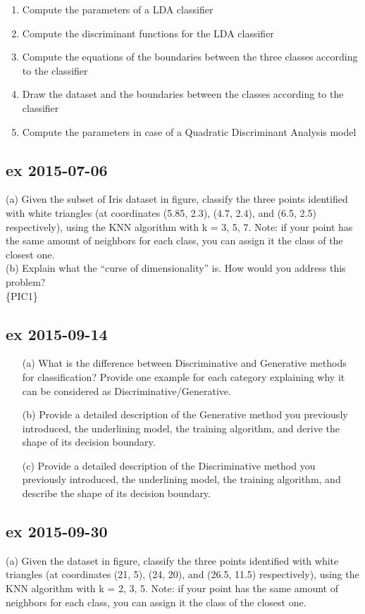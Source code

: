 \documentclass[a4paper,12pt,titlepage]{article} %
\begin{document}
\begin{enumerate}
\item Compute the parameters of a LDA classifier
\item Compute the discriminant functions for the LDA classifier
\item Compute the equations of the boundaries between the three classes according to
the classifier
\item Draw the dataset and the boundaries between the classes according to the classifier
\item Compute the parameters in case of a Quadratic Discriminant Analysis model
\end{enumerate}

\subsection{ex 2015-07-06}
(a) Given the subset of Iris dataset in figure, classify the three points identified with white triangles (at coordinates (5.85, 2.3), (4.7, 2.4), and (6.5, 2.5) respectively), using the KNN algorithm with k = 3, 5, 7. Note: if your point has the same amount of neighbors for each class, you can assign it the class of the closest one.\\

(b) Explain what the “curse of dimensionality” is. How would you address this problem?\\
\{PIC1\}

\subsection{ex 2015-09-14}
\begin{enumerate}
\item[(a)] What is the difference between Discriminative and Generative methods for classification? Provide one example for each category explaining why it can be considered as Discriminative/Generative.
\item[(b)] Provide a detailed description of the Generative method you previously introduced, the underlining model, the training algorithm, and derive the shape of its decision boundary.
\item[(c)] Provide a detailed description of the Discriminative method you previously introduced, the underlining model, the training algorithm, and describe the shape of its decision boundary.
\end{enumerate}

\subsection{ex 2015-09-30}
(a) Given the dataset in figure, classify the three points identified with white triangles (at coordinates (21, 5), (24, 20), and (26.5, 11.5) respectively), using the KNN algorithm with k = 2, 3, 5. Note: if your point has the same amount of neighbors for each class, you can assign it the class of the closest one.\\
\end{document}
